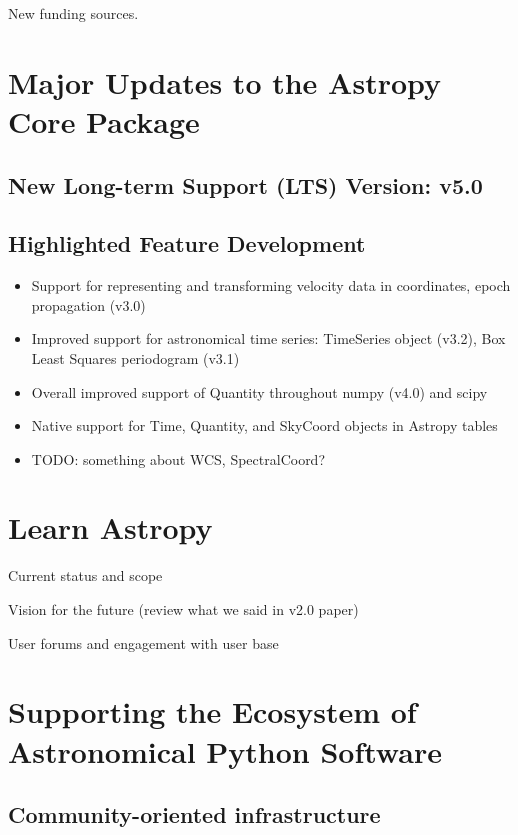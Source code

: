 \documentclass[modern]{aastex631}
\begin{document}
New funding sources.


\section{Major Updates to the Astropy Core Package} \label{sec:core-updates}

\subsection{New Long-term Support (LTS) Version: v5.0} \label{sec:core-v50}

\subsection{Highlighted Feature Development} \label{sec:core-features}

\begin{itemize}
    \item Support for representing and transforming velocity data in coordinates, epoch propagation (v3.0)
    \item Improved support for astronomical time series: TimeSeries object (v3.2), Box Least Squares periodogram (v3.1)
    \item Overall improved support of Quantity throughout numpy (v4.0) and scipy
    \item Native support for Time, Quantity, and SkyCoord objects in Astropy tables
    \item TODO: something about WCS, SpectralCoord?
\end{itemize}


\section{Learn Astropy} \label{sec:learn}

Current status and scope

Vision for the future (review what we said in v2.0 paper)

User forums and engagement with user base


\section{Supporting the Ecosystem of Astronomical Python Software}
\label{sec:ecosystem}

\subsection{Community-oriented infrastructure}
\end{document}

